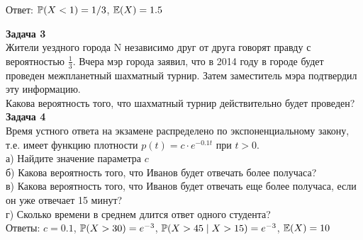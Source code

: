 \documentclass[12pt, a4paper]{article}\usepackage[]{graphicx}\usepackage[]{color}
\begin{document}
Ответ: $\P(X<1)=1/3$, $\E(X)=1.5$

\textbf{Задача 3} \\ %
Жители уездного города N независимо друг от друга говорят правду с вероятностью $\frac{1}{3}$. Вчера мэр города заявил, что в 2014 году в городе будет проведен межпланетный шахматный турнир. Затем заместитель мэра подтвердил эту информацию. \\
Какова вероятность того, что шахматный турнир действительно будет проведен? \\

\textbf{Задача 4} \\ %
Время устного ответа на экзамене распределено по экспоненциальному закону, т.е. имеет функцию плотности $p(t)=c\cdot e^{-0.1t}$ при $t>0$. \\
а) Найдите значение параметра $c$ \\
б) Какова вероятность того, что Иванов будет отвечать более получаса? \\
в) Какова вероятность того, что Иванов будет отвечать еще более получаса, если он уже отвечает 15 минут? \\
г) Сколько времени в среднем длится ответ одного студента? \\

Ответы: $c=0.1$, $\P(X>30)=e^{-3}$, $\P(X>45\mid X>15)=e^{-3}$, $\E(X)=10$




\end{document}
